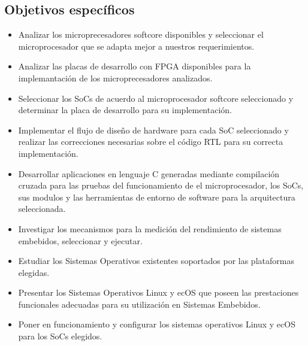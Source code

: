 \subsection{Objetivos específicos}
  \begin{itemize}
 \item Analizar los microprecesadores softcore disponibles y seleccionar el microprocesador que se adapta mejor a nuestros requerimientos.
 \item Analizar las placas de desarrollo con FPGA disponibles para la implemantación de los microprecesadores analizados.
  \item Seleccionar los SoCs de acuerdo al microprocesador softcore seleccionado y determinar la placa de desarrollo para su implementación.
\item Implementar el flujo de diseño de hardware para cada SoC seleccionado y realizar las correcciones necesarias sobre el código RTL para su correcta implementación. 
\item Desarrollar  aplicaciones en lenguaje C generadas mediante compilación cruzada para las pruebas del funcionamiento de el microprocesador, los SoCs, sus modulos y las herramientas de entorno de software para la arquitectura seleccionada.
\item Investigar los mecanismos para la medición del rendimiento de sistemas embebidos,  seleccionar y ejecutar. 
\item Estudiar los Sistemas Operativos existentes soportados por las plataformas elegidas.
\item Presentar los Sistemas Operativos Linux y ecOS que poseen las prestaciones funcionales adecuadas para su utilización en Sistemas Embebidos.
\item Poner en funcionamiento y configurar los sistemas operativos Linux y ecOS para los SoCs elegidos.
 \end{itemize}




